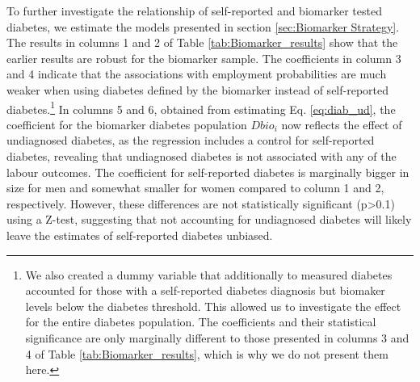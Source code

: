 To further investigate the relationship of self-reported and biomarker tested diabetes, we estimate the models presented in section \ref{sec:Biomarker Strategy}.  
The results in columns 1 and 2 of Table \ref{tab:Biomarker_results} show that the earlier results are robust for the biomarker sample. The coefficients in column 3 and 4 indicate that the associations with employment probabilities are much weaker when using diabetes defined by the biomarker instead of self-reported diabetes.\footnote{We also created a dummy variable that additionally to measured diabetes accounted for those with a self-reported diabetes diagnosis but biomaker levels below the diabetes threshold. This allowed us to investigate the effect for the entire diabetes population. The coefficients and their statistical significance are only marginally different to those presented in columns 3 and 4 of Table \ref{tab:Biomarker_results}, which is why we do not present them here.} In columns 5 and 6, obtained from estimating Eq. \ref{eq:diab_ud}, the coefficient for the biomarker diabetes population $Dbio_i$ now reflects the effect of undiagnosed diabetes, as the regression includes a control for self-reported diabetes, revealing that undiagnosed diabetes is not associated with any of the labour outcomes. The coefficient for self-reported diabetes is marginally bigger in size for men and somewhat smaller for women compared to column 1 and 2, respectively. However, these differences are not statistically significant (p>0.1) using a Z-test, suggesting that not accounting for undiagnosed diabetes will likely leave the estimates of self-reported diabetes unbiased.

